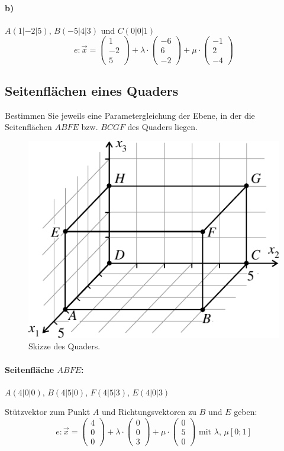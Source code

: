 \documentclass{ajc}
\numberwithin{equation}{subsection}
\begin{document}
	\paragraph{b)}$A(1|-2|5)$, $B(-5|4|3)$ und $C(0|0|1)$
	\begin{equation}
		e: \vec{x} = \left(\begin{array}{r} 1 \\ -2 \\ 5\end{array}\right) + \lambda \cdot \left(\begin{array}{r} -6 \\ 6 \\ -2\end{array}\right) + \mu \cdot \left(\begin{array}{r} -1 \\ 2 \\ -4\end{array}\right)
	\end{equation}
	
	\subsection{Seitenflächen eines Quaders}
	Bestimmen Sie jeweils eine Parametergleichung der Ebene, in der die Seitenflächen $ABFE$ bzw. $BCGF$ des Quaders liegen.
	\begin{figure}[ht]
		\centering
		\includegraphics[width=.3\textwidth]{ma_005_quader.pdf}
		\caption{Skizze des Quaders.}
		\label{fig:005_quader}
	\end{figure}
	
	\paragraph{Seitenfläche $ABFE$:} $A(4|0|0)$, $B(4|5|0)$, $F(4|5|3)$, $E(4|0|3)$
	
	Stützvektor zum Punkt $A$ und Richtungsvektoren zu $B$ und $E$ geben:
	\begin{equation}
		e: \overrightarrow{x} = \left(\begin{array}{r} 4 \\ 0 \\ 0\end{array}\right) + \lambda \cdot \left(\begin{array}{r} 0 \\ 0 \\ 3\end{array}\right) + \mu \cdot \left(\begin{array}{r} 0 \\ 5 \\ 0\end{array}\right) \text{ mit } \lambda,\,\mu \left[0;1\right]
	\end{equation}
	
\end{document}
